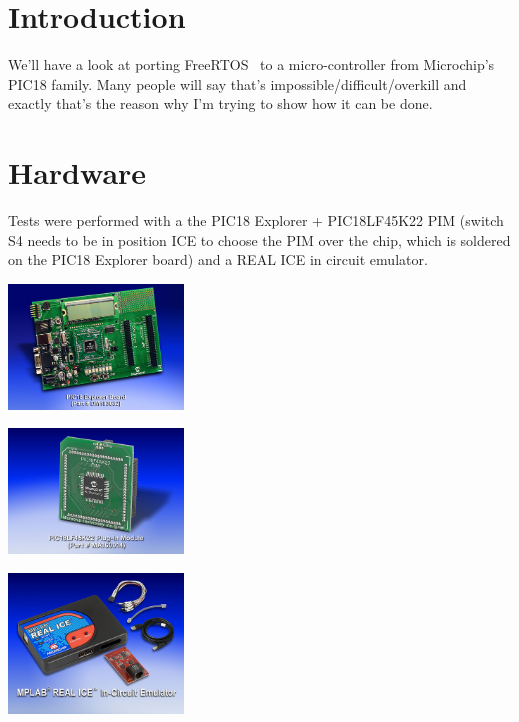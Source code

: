 \documentclass[a4paper,11pt]{article}
\begin{document}
\section{Introduction}
We'll have a look at porting FreeRTOS~\cite{freertos-site} to a
micro-controller from Microchip's~\cite{microchip-site} PIC18 family. Many
people will say that's impossible/difficult/overkill and exactly that's the
reason why I'm trying to show how it can be done.

\section{Hardware}
Tests were performed with a the PIC18 Explorer + PIC18LF45K22 PIM (switch S4
needs to be in position ICE to choose the PIM over the chip, which is soldered
on the PIC18 Explorer board) and a REAL ICE in circuit emulator.
 \begin{center}
  \includegraphics[width=0.35\textwidth]{PIC18-Explorer-board}
 \end{center}

 \begin{center}
  \includegraphics[width=0.35\textwidth]{PIC18LF45K22-PIM}
 \end{center}

 \begin{center}
  \includegraphics[width=0.35\textwidth]{Real-ICE}
 \end{center}
\end{document}
